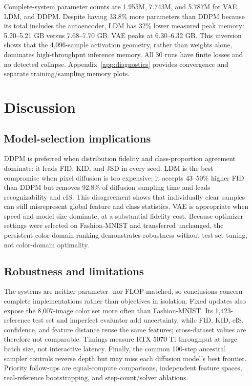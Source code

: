 \documentclass{article}
\begin{document}
Complete-system parameter counts are 1.955M, 7.743M, and 5.787M for VAE, LDM, and DDPM. Despite having 33.8\% more parameters than DDPM because its total includes the autoencoder, LDM has 32\% lower measured peak memory: 5.20--5.21 GB versus 7.68--7.70 GB. VAE peaks at 6.30--6.32 GB. This inversion shows that the 4,096-sample activation geometry, rather than weights alone, dominates high-throughput inference memory. All 30 runs have finite losses and no detected collapse. Appendix~\ref{app:diagnostics} provides convergence and separate training/sampling memory plots.

\begin{table}[H]
\caption{Computational results, mean $\pm$ sample SD over five seeds. LDM totals include its VAE; sampling is batched throughput.}
\label{tab:compute}
\centering
\scriptsize
\resizebox{\linewidth}{!}{}
\end{table}

\section{Discussion}
\subsection{Model-selection implications}
DDPM is preferred when distribution fidelity and class-proportion agreement dominate: it leads FID, KID, and JSD in every seed. LDM is the best compromise when pixel diffusion is too expensive; it accepts 43--50\% higher FID than DDPM but removes 92.8\% of diffusion sampling time and leads recognizability and cIS. This disagreement shows that individually clear samples can still misrepresent global feature and class statistics. VAE is appropriate when speed and model size dominate, at a substantial fidelity cost. Because optimizer settings were selected on Fashion-MNIST and transferred unchanged, the persistent color-domain ranking demonstrates robustness without test-set tuning, not color-domain optimality.

\subsection{Robustness and limitations}
The systems are neither parameter- nor FLOP-matched, so conclusions concern complete implementations rather than objectives in isolation. Fixed updates also expose the 8,007-image color set more often than Fashion-MNIST. Its 1,423-reference test set and imperfect evaluator add uncertainty, while FID, KID, cIS, confidence, and feature distance reuse the same features; cross-dataset values are therefore not comparable. Timings measure RTX 5070 Ti throughput at large batch size, not interactive latency. Finally, the common 100-step ancestral sampler controls reverse depth but may miss each diffusion model's best frontier. Priority follow-ups are equal-compute comparisons, independent feature spaces, real-reference bootstrapping, and step-count/solver ablations.
\end{document}
